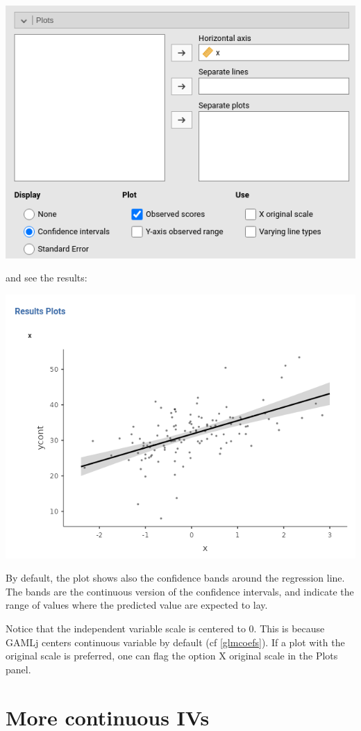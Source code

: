 \documentclass[
]{book}
\begin{document}
\includegraphics[width=0.9\linewidth]{bookletpics/2_input3}

and see the results:

\includegraphics[width=0.9\linewidth]{bookletpics/2_plot1}

By default, the plot shows also the confidence bands around the regression line. The bands are the continuous version of the confidence intervals, and indicate the range of values where the predicted value are expected to lay.

Notice that the independent variable scale is centered to 0. This is because {GAMLj} centers continuous variable by default (cf \ref{glmcoefs}). If a plot with the original scale is preferred, one can flag the option {X original scale} in the {Plots} panel.

\hypertarget{multiregression}{%
\section{More continuous IVs}\label{multiregression}}
\end{document}
